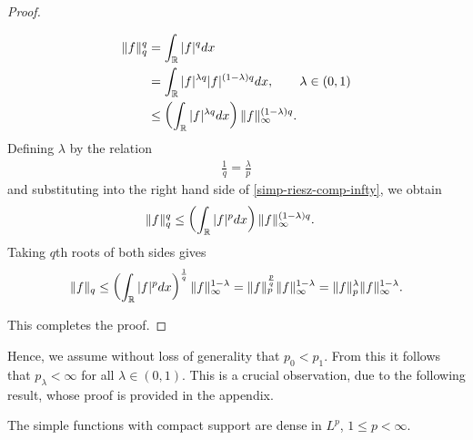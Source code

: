 \begin{proof}
\begin{case}[$r = \infty$]
\begin{equation}
\begin{split}
		\| f \|_{q}^{q}
		& = \int_{\mathbb{R}} | f |^{q}dx
		\\
		& = \int_{\mathbb{R}} | f |^{\lambda q} | f |^{(1-\lambda)q} dx, \qquad \lambda \in
		(0,1)
		\\
		& \le \left( \int_{\mathbb{R}} | f |^{\lambda q} dx \right)
		\| f \|_{\infty}^{(1 - \lambda)q}.
	\end{split}
\end{equation}
Defining $\lambda$ by the relation
%
%
\begin{equation*}
	\begin{split}
		\frac{1}{q} = \frac{\lambda}{p}
	\end{split}
\end{equation*}
and substituting into the right hand side of \eqref{simp-riesz-comp-infty}, we obtain
%
%
\begin{equation*}
	\begin{split}
		\| f \|_{q}^{q}
		& \le \left( \int_{\mathbb{R}} | f |^{p} dx \right) \|f \|_{\infty}^{(1 -
		\lambda)q}.
	\end{split}
\end{equation*}
%
%
Taking $q$th roots of both sides gives
%
%
\begin{equation*}
	\begin{split}
		\|f\|_{q} \le \left( \int_{\mathbb{R}} | f |^{p} dx \right)^{\frac{1}{q}}
		\|f \|_{\infty}^{1 -\lambda} = \|f\|_{p}^{\frac{p}{q}}
		\|f\|_{\infty}^{1 - \lambda} = \|f\|_{p}^{\lambda} \|f\|_{\infty}^{1-
		\lambda}.
	\end{split}
\end{equation*}
\end{case}
%
%
This completes the proof. 
\end{proof}
%
Hence, we assume without loss of generality that $p_0 < p_1$. From this it
follows that $p_\lambda < \infty$ for all $\lambda \in (0,1)$. This is a crucial
observation, due to the following result, whose proof is provided in the
appendix.
%
%
%
%
%
%
%
%
%
%
\begin{lemma}
\label{lem:simp-func}
The simple functions with compact support are dense in $L^{p}$, $1 \le p <
\infty$.
\end{lemma}
%
%
